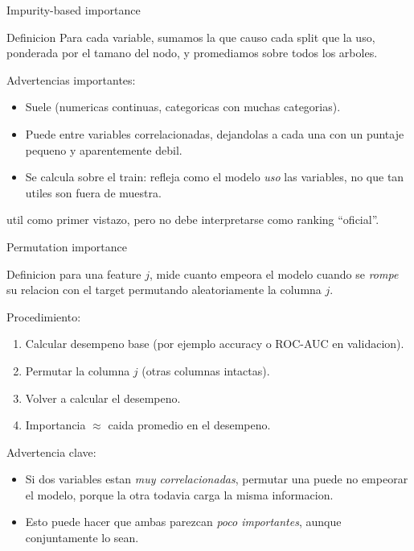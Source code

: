 \begin{frame}{Impurity-based importance}
\begin{block}{Definicion}
\small
Para cada variable, sumamos la  que causo cada split que la uso, ponderada por el tamano del nodo, y promediamos sobre todos los arboles.
\end{block}

\vspace{0.3em}
Advertencias importantes:
\begin{itemize}\small
  \item Suele  (numericas continuas, categoricas con muchas categorias).
  \item Puede  entre variables correlacionadas, dejandolas a cada una con un puntaje pequeno y aparentemente debil.
  \item Se calcula sobre el train: refleja como el modelo \emph{uso} las variables, no que tan utiles son fuera de muestra.
\end{itemize}

\vspace{0.2em}
 util como primer vistazo, pero no debe interpretarse como ranking ``oficial''.
\end{frame}

\begin{frame}{Permutation importance}
\begin{block}{Definicion}
\small
{} para una feature $j$, mide cuanto empeora el modelo cuando se \emph{rompe} su relacion con el target permutando aleatoriamente la columna $j$.
\end{block}

\vspace{0.3em}
Procedimiento:
\begin{enumerate}\small
  \item Calcular desempeno base (por ejemplo accuracy o ROC-AUC en validacion).
  \item Permutar la columna $j$ (otras columnas intactas).
  \item Volver a calcular el desempeno.
  \item Importancia $\approx$ caida promedio en el desempeno.
\end{enumerate}

\vspace{0.3em}
Advertencia clave:
\begin{itemize}\small
  \item Si dos variables estan \emph{muy correlacionadas}, permutar una puede no empeorar el modelo, porque la otra todavia carga la misma informacion.
  \item Esto puede hacer que ambas parezcan \emph{poco importantes}, aunque conjuntamente lo sean.
\end{itemize}
\end{frame}

